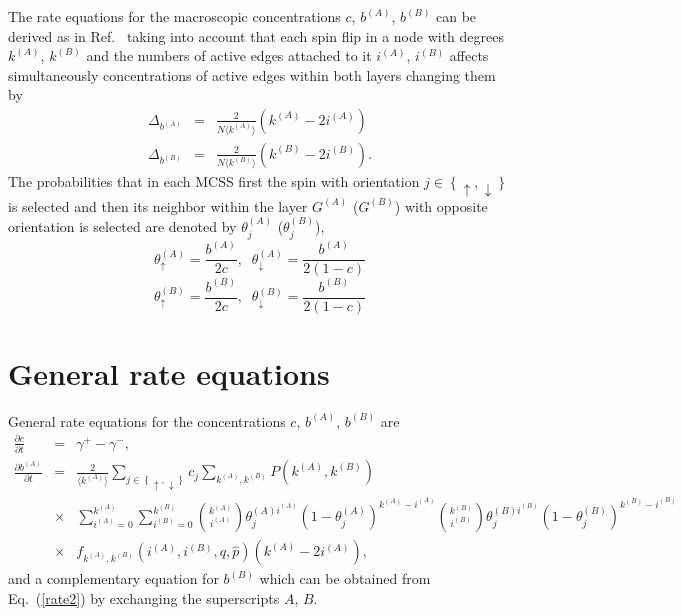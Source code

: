 \documentclass[11pt]{article}
\begin{document}
The rate equations for the macroscopic concentrations $c$, $b^{(A)}$, $b^{(B)}$ can be derived as in Ref.\ 
\cite{Jedrzejewski17} taking into account that each spin flip 
in a node with degrees $k^{(A)}$, $k^{(B)}$ and the numbers of active edges attached to it $i^{(A)}$, $i^{(B)}$ 
affects simultaneously concentrations of active edges within both layers changing them by
\begin{eqnarray}
\Delta_{b^{(A)}}&=&\frac{2}{N\langle k^{(A)}\rangle}\left( k^{(A)}-2i^{(A)} \right) \nonumber\\
\Delta_{b^{(B)}}&=&\frac{2}{N\langle k^{(B)}\rangle}\left( k^{(B)}-2i^{(B)} \right).
\end{eqnarray}
The probabilities that in each MCSS first the spin with orientation $j\in \left\{ \uparrow,\downarrow\right\}$ 
is selected and then its neighbor within the layer $G^{(A)}$ ($G^{(B)}$) with opposite orientation is selected are denoted
by $\theta_{j}^{(A)}$ ($\theta_{j}^{(B)}$),
\begin{equation}
\theta_{\uparrow}^{(A)}=\frac{b^{(A)}}{2c},\;\; \theta_{\downarrow}^{(A)}=\frac{b^{(A)}}{2(1-c)}
\end{equation}
\begin{equation}
\theta_{\uparrow}^{(B)}=\frac{b^{(B)}}{2c},\;\; \theta_{\downarrow}^{(B)}=\frac{b^{(B)}}{2(1-c)}
\end{equation}

\section{General rate equations}

General rate equations for the concentrations $c$, $b^{(A)}$, $b^{(B)}$ are
\begin{eqnarray}
\frac{\partial c}{\partial t} &=&\gamma^{+}-\gamma^{-}, 
\label{rate1}\\
\frac{\partial b^{(A)}}{\partial t} &=& \frac{2}{\langle k^{(A)}\rangle} \sum_{j\in \left\{ \uparrow,\downarrow\right\}} c_{j}
\sum_{k^{(A)},k^{(B)}} P\left( k^{(A)}, k^{(B)}\right) 
\nonumber\\
&\times&
\sum_{i^{(A)}=0}^{k^{(A)}} \sum_{i^{(B)}=0}^{k^{(B)}} 
{k^{(A)} \choose i^{(A)} } \theta_{j}^{(A)i^{(A)}}\left( 1-\theta_{j}^{(A)}\right)^{k^{(A)}-i^{(A)}}
{k^{(B)} \choose i^{(B)} } \theta_{j}^{(B)i^{(B)}}\left( 1-\theta_{j}^{(B)}\right)^{k^{(B)}-i^{(B)}}
\nonumber\\
&\times& f_{k^{(A)},k^{(B)}}\left( i^{(A)},i^{(B)},q,\hat{p}\right) \left( k^{(A)}-2i^{(A)}\right), \label{rate2}
\end{eqnarray}
and a complementary equation for $b^{(B)}$ which can be obtained from Eq.\ (\ref{rate2}) by exchanging the
superscripts $A$, $B$.
\end{document}
